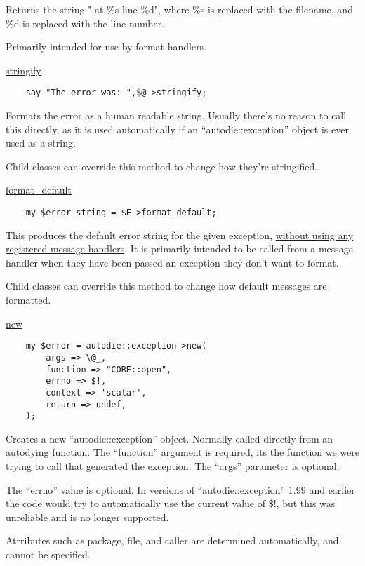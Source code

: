 \documentclass[]{article}
\renewcommand{\emph}[1]{\underline{#1}}
\begin{document}
Returns the string " at \%s line \%d", where \%s is replaced with the
filename, and \%d is replaced with the line number.

Primarily intended for use by format handlers.

\emph{stringify}

\begin{verbatim}
    say "The error was: ",$@->stringify;
\end{verbatim}

Formats the error as a human readable string. Usually there's no reason
to call this directly, as it is used automatically if an
``autodie::exception'' object is ever used as a string.

Child classes can override this method to change how they're
stringified.

\emph{format\_default}

\begin{verbatim}
    my $error_string = $E->format_default;
\end{verbatim}

This produces the default error string for the given exception,
\emph{without using any registered message handlers}. It is primarily
intended to be called from a message handler when they have been passed
an exception they don't want to format.

Child classes can override this method to change how default messages
are formatted.

\emph{new}

\begin{verbatim}
    my $error = autodie::exception->new(
        args => \@_,
        function => "CORE::open",
        errno => $!,
        context => 'scalar',
        return => undef,
    );
\end{verbatim}

Creates a new ``autodie::exception'' object. Normally called directly
from an autodying function. The ``function'' argument is required, its
the function we were trying to call that generated the exception. The
``args'' parameter is optional.

The ``errno'' value is optional. In versions of ``autodie::exception''
1.99 and earlier the code would try to automatically use the current
value of \$!, but this was unreliable and is no longer supported.

Atrributes such as package, file, and caller are determined
automatically, and cannot be specified.

\end{document}
